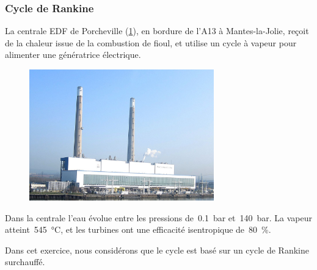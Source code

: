 \begin{boiboiboite}
	\propeau
	\propair
\end{boiboiboite}

\subsubsection{Cycle de Rankine}
	\label{exo_porcheville_rankine}

	La centrale EDF de Porcheville (\cref{fig_porcheville}), en bordure de l’A13 à Mantes-la-Jolie, reçoit de la chaleur issue de la combustion de fioul, et utilise un cycle à vapeur pour alimenter une génératrice électrique.
	
	\begin{figure}
		\begin{center}
			\includegraphics[width=8cm]{images/porcheville.jpg}
			\vspace{-0.5cm}
		\end{center}
		\label{fig_porcheville}
	\end{figure}
	
	Dans la centrale l’eau évolue entre les pressions de~\SI{0,1}{\bar} et~\SI{140}{\bar}. La vapeur atteint~\SI{545}{\degreeCelsius}, et les turbines ont une efficacité isentropique de~\SI{80}{\percent}.

	Dans cet exercice, nous considérons que le cycle est basé sur un cycle de Rankine surchauffé.
	
